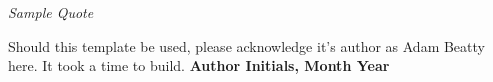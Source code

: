 
\begin{center}
	\begin{minipage}{0.6\textwidth}
		\centering\itshape
		Sample Quote
	\end{minipage}
\end{center}

\vspace{1em}
Should this template be used, please acknowledge it's author as Adam Beatty here. It took a time to build.
\linebreak
\textbf{Author Initials, Month Year}

